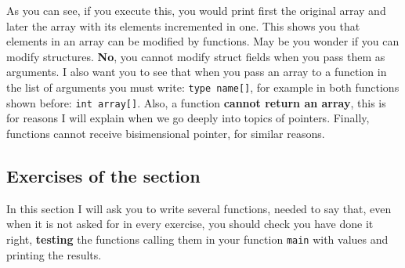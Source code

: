 \documentclass[a4paper]{article}
\begin{document}
As you can see, if you execute this, you would print first the original array
and later the array with its elements incremented in one. This shows you that
elements in an array can be modified by functions. May be you wonder if you can
modify structures. \textbf{No}, you cannot modify struct fields when you pass
them as arguments. I also want you to see that when you pass an array to a
function in the list of arguments you must write: \verb!type name[]!, for
example in both functions shown before: \verb!int array[]!. Also, a function
\textbf{cannot return an array}, this is for reasons I will explain when we go
deeply into topics of pointers. Finally, functions cannot receive bisimensional
pointer, for similar reasons.


\subsection{Exercises of the section}
In this section I will ask you to write several functions, needed to say that,
even when it is not asked for in every exercise, you should check
you have done it right, \textbf{testing} the functions calling them in your
function \verb!main! with values and printing the results.
\end{document}
